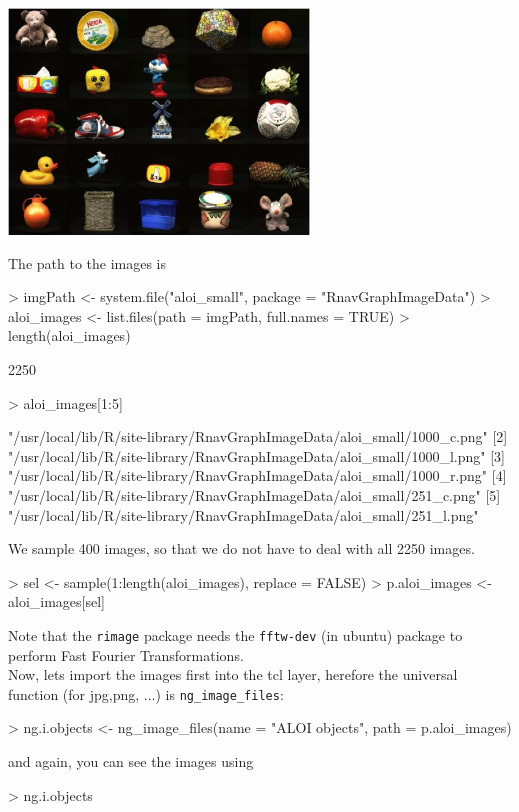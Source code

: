 \documentclass[12pt,oneside,titlepage,letter]{article}
\newcommand{\modify}[1]{{\color{blue}#1}}
\begin{document}
\begin{center}
  \includegraphics[width = 0.6\textwidth]{img/aloi.jpg}
\end{center}

The path to the images is
\begin{Schunk}
\begin{Sinput}
> imgPath <- system.file("aloi_small", package = "RnavGraphImageData")
> aloi_images <- list.files(path = imgPath, full.names = TRUE)
> length(aloi_images)
\end{Sinput}
\begin{Soutput}
[1] 2250
\end{Soutput}
\begin{Sinput}
> aloi_images[1:5]
\end{Sinput}
\begin{Soutput}
[1] "/usr/local/lib/R/site-library/RnavGraphImageData/aloi_small/1000_c.png"
[2] "/usr/local/lib/R/site-library/RnavGraphImageData/aloi_small/1000_l.png"
[3] "/usr/local/lib/R/site-library/RnavGraphImageData/aloi_small/1000_r.png"
[4] "/usr/local/lib/R/site-library/RnavGraphImageData/aloi_small/251_c.png" 
[5] "/usr/local/lib/R/site-library/RnavGraphImageData/aloi_small/251_l.png" 
\end{Soutput}
\end{Schunk}
We sample 400 images, so that we do not have to deal with all 2250 images.
\begin{Schunk}
\begin{Sinput}
> sel <- sample(1:length(aloi_images), replace = FALSE)
> p.aloi_images <- aloi_images[sel]
\end{Sinput}
\end{Schunk}


\modify{Note that the \texttt{rimage} package needs the \texttt{fftw-dev} (in ubuntu) package to perform Fast Fourier Transformations.}\\


Now, lets import the images first into the tcl layer, herefore the \modify{universal function (for jpg,png, ...)} is \texttt{ng\_image\_files}:
\begin{Schunk}
\begin{Sinput}
> ng.i.objects <- ng_image_files(name = "ALOI objects", path = p.aloi_images)
\end{Sinput}
\end{Schunk}
and again, you can see the images using
\begin{Schunk}
\begin{Sinput}
> ng.i.objects
\end{Sinput}
\end{Schunk}
\end{document}
